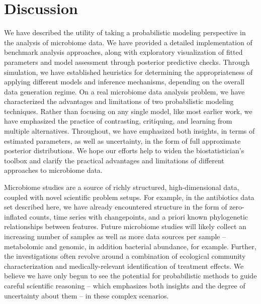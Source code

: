 \section{Discussion}
We have described the utility of taking a probabilistic modeling perspective in
the analysis of microbiome data. We have provided a detailed implementation of
benchmark analysis approaches, along with exploratory visualization of fitted
parameters and model assessment through posterior predictive checks. Through
simulation, we have established heuristics for determining the appropriateness
of applying different models and inference mechanisms, depending on the overall
data generation regime. On a real microbiome data analysis problem, we have
characterized the advantages and limitations of two probabilistic modeling
techniques. Rather than focusing on any single model, like most earlier work, we
have emphasized the practice of contrasting, critiquing, and learning from
multiple alternatives. Throughout, we have emphasized both insights, in terms of
estimated parameters, as well as uncertainty, in the form of full approximate
posterior distributions. We hope our efforts help to widen the biostatistician's
toolbox and clarify the practical advantages and limitations of different
approaches to microbiome data.

Microbiome studies are a source of richly structured, high-dimensional data,
coupled with novel scientific problem setups. For example, in the antibiotics
data set described here, we have already encountered structure in the form of
zero-inflated counts, time series with changepoints, and a priori known
phylogenetic relationships between features. Future microbiome studies will
likely collect an increasing number of samples as well as more data sources per
sample -- metabolomic and genomic, in addition bacterial abundance, for example.
Further, the investigations often revolve around a combination of ecological
community characterization and medically-relevant identification of treatment
effects. We believe we have only begun to see the potential for probabilistic
methods to guide careful scientific reasoning -- which emphasizes both insights
and the degree of uncertainty about them -- in these complex scenarios.


